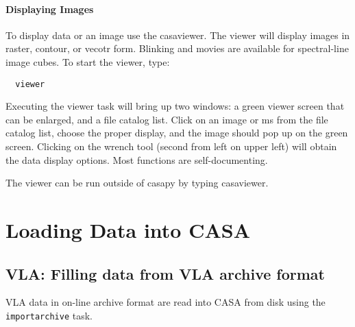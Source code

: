 \subsubsection{Displaying Images}
\label{subsubsection:display.images}

To display data or an image use the casaviewer.  The viewer will
display images in raster, contour, or vecotr form.  Blinking and
movies are available for spectral-line image cubes.  To start the
viewer, type:

\small
\begin{verbatim}
  viewer
\end{verbatim}
\normalsize

Executing the viewer task will bring up two windows: a green viewer
screen that can be enlarged, and a file catalog list. Click on an
image or ms from the file catalog list, choose the proper display, and
the image should pop up on the green screen. Clicking on the wrench
tool (second from left on upper left) will obtain the data display
options. Most functions are self-documenting. 

The viewer can be run outside of casapy by typing casaviewer. 


\chapter{Loading Data into CASA}
\label{chapter:fill} 

\section{VLA: Filling data from VLA archive format}
\label{section:vla.archive.fill}

VLA data in on-line archive format are read into CASA from disk 
using the {\tt importarchive} task.

